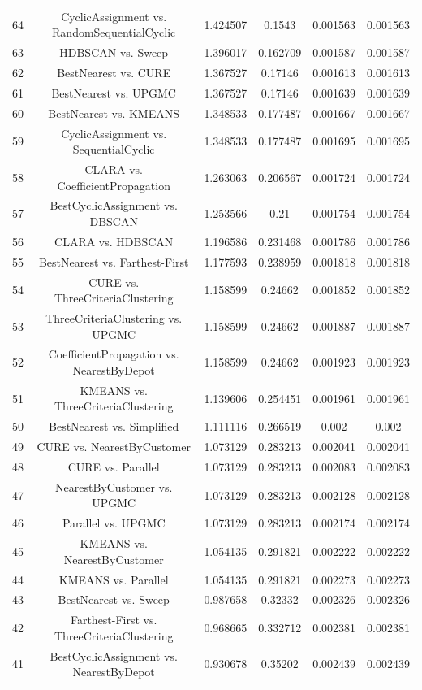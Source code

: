 \documentclass[a4paper,10pt]{article}
\begin{document}
\begin{landscape}
\begin{table}[!htp]
\begin{tabular}{cccccc}
64&CyclicAssignment vs. RandomSequentialCyclic&1.424507&0.1543&0.001563&0.001563\\
63&HDBSCAN vs. Sweep&1.396017&0.162709&0.001587&0.001587\\
62&BestNearest vs. CURE&1.367527&0.17146&0.001613&0.001613\\
61&BestNearest vs. UPGMC&1.367527&0.17146&0.001639&0.001639\\
60&BestNearest vs. KMEANS&1.348533&0.177487&0.001667&0.001667\\
59&CyclicAssignment vs. SequentialCyclic&1.348533&0.177487&0.001695&0.001695\\
58&CLARA vs. CoefficientPropagation&1.263063&0.206567&0.001724&0.001724\\
57&BestCyclicAssignment vs. DBSCAN&1.253566&0.21&0.001754&0.001754\\
56&CLARA vs. HDBSCAN&1.196586&0.231468&0.001786&0.001786\\
55&BestNearest vs. Farthest-First&1.177593&0.238959&0.001818&0.001818\\
54&CURE vs. ThreeCriteriaClustering&1.158599&0.24662&0.001852&0.001852\\
53&ThreeCriteriaClustering vs. UPGMC&1.158599&0.24662&0.001887&0.001887\\
52&CoefficientPropagation vs. NearestByDepot&1.158599&0.24662&0.001923&0.001923\\
51&KMEANS vs. ThreeCriteriaClustering&1.139606&0.254451&0.001961&0.001961\\
50&BestNearest vs. Simplified&1.111116&0.266519&0.002&0.002\\
49&CURE vs. NearestByCustomer&1.073129&0.283213&0.002041&0.002041\\
48&CURE vs. Parallel&1.073129&0.283213&0.002083&0.002083\\
47&NearestByCustomer vs. UPGMC&1.073129&0.283213&0.002128&0.002128\\
46&Parallel vs. UPGMC&1.073129&0.283213&0.002174&0.002174\\
45&KMEANS vs. NearestByCustomer&1.054135&0.291821&0.002222&0.002222\\
44&KMEANS vs. Parallel&1.054135&0.291821&0.002273&0.002273\\
43&BestNearest vs. Sweep&0.987658&0.32332&0.002326&0.002326\\
42&Farthest-First vs. ThreeCriteriaClustering&0.968665&0.332712&0.002381&0.002381\\
41&BestCyclicAssignment vs. NearestByDepot&0.930678&0.35202&0.002439&0.002439\\

\end{tabular}
\end{table}
\end{landscape}
\end{document}
